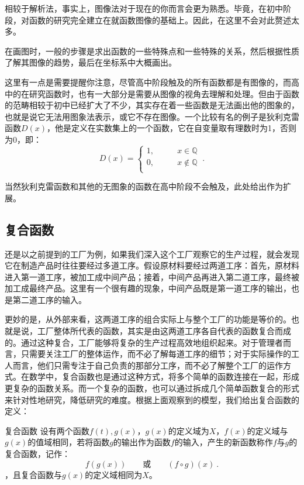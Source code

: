 相较于解析法，事实上，图像法对于现在的你而言会更为熟悉。毕竟，在初中阶段，对函数的研究完全建立在就函数图像的基础上。因此，在这里不会对此赘述太多。

在画图时，一般的步骤是求出函数的一些特殊点和一些特殊的关系，然后根据性质了解其图像的趋势，最后在坐标系中大概画出。

这里有一点是需要提醒你注意，尽管高中阶段触及的所有函数都是有图像的，而高中的在研究函数时，也有一大部分是需要从图像的视角去理解和处理。但由于函数的范畴相较于初中已经扩大了不少，其实存在着一些函数是无法画出他的图象的，也就是说它无法用图象法表示，或它不存在图像。一个比较有名的例子是狄利克雷函数$D(x)$，他是定义在实数集上的一个函数，它在自变量取有理数时为1，否则为0，即：
\begin{equation}\label{eq_functi_1}
D(x)=\begin{cases}
1,\qquad& x\in\mathbb{Q} \\
0,\qquad& x\notin\mathbb{Q}  \\
\end{cases} ~.
\end{equation}

当然狄利克雷函数和其他的无图象的函数在高中阶段不会触及，此处给出作为扩展。

\subsection{复合函数}

还是以之前提到的工厂为例，如果我们深入这个工厂观察它的生产过程，就会发现它在制造产品时往往要经过多道工序。假设原材料要经过两道工序：首先，原材料进入第一道工序，被加工成中间产品；接着，中间产品再进入第二道工序，最终被加工成最终产品。这里有一个很有趣的现象，中间产品既是第一道工序的输出，也是第二道工序的输入。

更妙的是，从外部来看，这两道工序的组合实际上与整个工厂的功能是等价的。也就是说，工厂整体所代表的函数，其实是由这两道工序各自代表的函数复合而成的。通过这种复合，工厂能够将复杂的生产过程高效地组织起来。对于管理者而言，只需要关注工厂的整体运作，而不必了解每道工序的细节；对于实际操作的工人而言，他们只需专注于自己负责的那部分工序，而不必了解整个工厂的运作方式。在数学中，复合函数也是通过这种方式，将多个简单的函数连接在一起，形成更复杂的函数关系。而一个复杂的函数，也可以通过拆成几个简单函数复合的形式来针对性地研究，降低研究的难度。根据上面观察到的模型，我们给出复合函数的定义：

\begin{definition}{复合函数}
设有两个函数$f(t),g(x)$，$g(x)$的定义域为$X$，$f(x)$的定义域与$g(x)$的值域相同，若将函数$g$的输出作为函数$f$的输入，产生的新函数称作$f$与$g$的复合函数，记作：
\begin{equation}
f(g(x))\qquad\text{或}\qquad(f \circ g)(x)~.
\end{equation}
，且复合函数与$g(x)$的定义域相同为$X$。
\end{definition}

